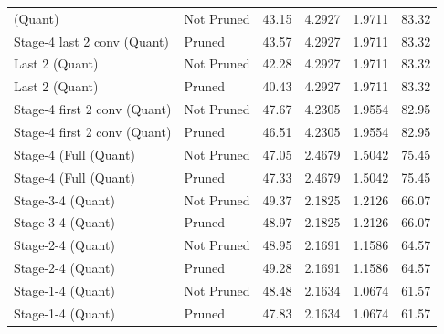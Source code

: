 \begin{table}
\begin{tabular}{llcccc}
(Quant) & Not Pruned & 43.15 & 4.2927 & 1.9711 & 83.32 \\
Stage-4 last 2 conv
(Quant) & Pruned & 43.57 & 4.2927 & 1.9711 & 83.32 \\
Last 2
(Quant) & Not Pruned & 42.28 & 4.2927 & 1.9711 & 83.32 \\
Last 2
(Quant) & Pruned & 40.43 & 4.2927 & 1.9711 & 83.32 \\
Stage-4 first 2 conv
(Quant) & Not Pruned & 47.67 & 4.2305 & 1.9554 & 82.95 \\
Stage-4 first 2 conv
(Quant) & Pruned & 46.51 & 4.2305 & 1.9554 & 82.95 \\
Stage-4 (Full
(Quant) & Not Pruned & 47.05 & 2.4679 & 1.5042 & 75.45 \\
Stage-4 (Full
(Quant) & Pruned & 47.33 & 2.4679 & 1.5042 & 75.45 \\
Stage-3-4
(Quant) & Not Pruned & 49.37 & 2.1825 & 1.2126 & 66.07 \\
Stage-3-4
(Quant) & Pruned & 48.97 & 2.1825 & 1.2126 & 66.07 \\
Stage-2-4
(Quant) & Not Pruned & 48.95 & 2.1691 & 1.1586 & 64.57 \\
Stage-2-4
(Quant) & Pruned & 49.28 & 2.1691 & 1.1586 & 64.57 \\
Stage-1-4
(Quant) & Not Pruned & 48.48 & 2.1634 & 1.0674 & 61.57 \\
Stage-1-4
(Quant) & Pruned & 47.83 & 2.1634 & 1.0674 & 61.57 \\
\bottomrule
\end{tabular}
\end{table}
